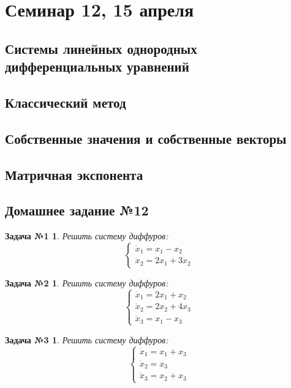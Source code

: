 \documentclass[a4paper,12pt]{article}
\newtheorem*{task1}{Задача №1}
\newtheorem*{task2}{Задача №2}
\newtheorem*{task3}{Задача №3}
\newcommand{\dx}{\dot{x}}
\begin{document}
\section{Семинар 12, 15 апреля}

\subsection{Системы линейных однородных дифференциальных уравнений}

\subsection{Классический метод}

\subsection{Собственные значения и собственные векторы}

\subsection{Матричная экспонента}


\subsection{Домашнее задание №12}


\begin{task1}
	Решить систему диффуров:
	\[\begin{cases}
		\dx_1 = x_1 - x_2\\
		\dx_2 = 2x_1 + 3x_2
	\end{cases}\]
\end{task1}
%

\begin{task2}
	Решить систему диффуров:
	\[\begin{cases}
		\dx_1 = 2x_1 + x_2\\
		\dx_2 = 2x_2 + 4x_3\\
		\dx_3 = x_1 - x_3
	\end{cases}\]
\end{task2}
%

\begin{task3}
	Решить систему диффуров:
	\[\begin{cases}
		\dx_1 = x_1 + x_3\\
		\dx_2 = x_3\\
		\dx_3 = x_2 + x_3
	\end{cases}\]
\end{task3}
%	
\end{document}

